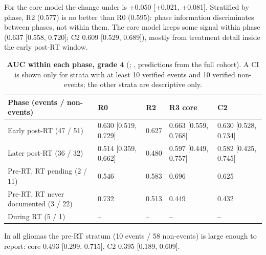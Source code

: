 \documentclass[11pt,a4paper]{article}
\begin{document}
For the core model the change under  is +0.050 [+0.021, +0.081]. Stratified by phase, R2 (0.577) is
no better than R0 (0.595): phase information discriminates between phases, not within them. The core model keeps some
signal within phase (0.637 [0.558, 0.720]; C2 0.609 [0.529, 0.689]), mostly from treatment detail inside the early
post-RT window.

\begin{table}[H]
\centering
\small
\renewcommand{\thetable}{S32}\renewcommand{\theHtable}{S32}
\caption{\textbf{AUC within each phase, grade 4} (; , predictions from the
full cohort). A CI is shown only for strata with at least 10 verified events and 10 verified non-events; the other
strata are descriptive only.}
\label{tab:S32}
\begin{tabularx}{\linewidth}{@{}L R{2.9cm} R{1.1cm} R{2.9cm} R{2.9cm}@{}}
\toprule
Phase (events / non-events) & R0 & R2 & R3 core & C2 \\
\midrule
Early post-RT (47 / 51) & 0.630 [0.519, 0.729] & 0.627 & 0.663 [0.559, 0.768] & 0.630 [0.528, 0.734] \\
Later post-RT (36 / 32) & 0.514 [0.359, 0.662] & 0.480 & 0.597 [0.449, 0.757] & 0.582 [0.425, 0.745] \\
Pre-RT, RT pending (2 / 11) & 0.546 & 0.583 & 0.696 & 0.625 \\
Pre-RT, RT never documented (3 / 22) & 0.732 & 0.513 & 0.449 & 0.432 \\
During RT (5 / 1) & -- & -- & -- & -- \\
\bottomrule
\end{tabularx}
\end{table}

In all gliomas the pre-RT stratum (10 events / 58 non-events) is large enough to report: core 0.493 [0.299, 0.715],
C2 0.395 [0.189, 0.609].
\end{document}

